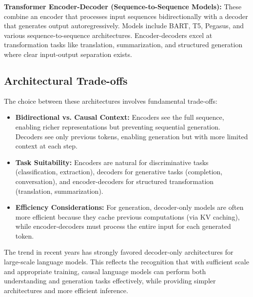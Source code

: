 \documentclass{book}
\begin{document}
\textbf{Transformer Encoder-Decoder (Sequence-to-Sequence Models):} These combine an encoder that processes input sequences bidirectionally with a decoder that generates output autoregressively. Models include BART, T5, Pegasus, and various sequence-to-sequence architectures. Encoder-decoders excel at transformation tasks like translation, summarization, and structured generation where clear input-output separation exists.

\subsection{Architectural Trade-offs}

The choice between these architectures involves fundamental trade-offs:

\begin{itemize}
    \item \textbf{Bidirectional vs. Causal Context:} Encoders see the full sequence, enabling richer representations but preventing sequential generation. Decoders see only previous tokens, enabling generation but with more limited context at each step.
    \item \textbf{Task Suitability:} Encoders are natural for discriminative tasks (classification, extraction), decoders for generative tasks (completion, conversation), and encoder-decoders for structured transformation (translation, summarization).
    \item \textbf{Efficiency Considerations:} For generation, decoder-only models are often more efficient because they cache previous computations (via KV caching), while encoder-decoders must process the entire input for each generated token.
\end{itemize}

The trend in recent years has strongly favored decoder-only architectures for large-scale language models. This reflects the recognition that with sufficient scale and appropriate training, causal language models can perform both understanding and generation tasks effectively, while providing simpler architectures and more efficient inference.

\end{document}
